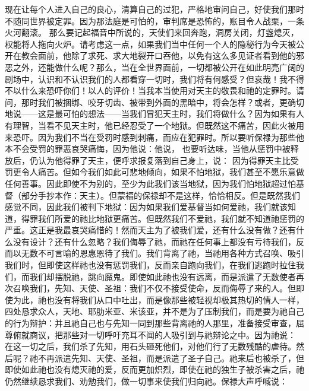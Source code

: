 现在让每个人进入自己的良心，清算自己的过犯，严格地审问自己，好使我们那时不随同世界被定罪。因为那法庭是可怕的，审判席是恐怖的，账目令人战栗，一条火河翻滚。 那么要记起福音中所说的，天使们来回奔跑，洞房关闭，灯盏熄灭，权能将人拖向火炉。请考虑这一点，如果我们当中任何一个人的隐秘行为今天被公开在教会面前，他除了求死、求大地裂开口吞他，以免有这么多见证者看到他的邪恶之外，还能做什么呢？那么，当在全世界面前，一切都被公开在如此明亮广阔的剧场中，认识和不认识我们的人都看穿一切时，我们将有何感受？但哀哉！我不得不以什么来恐吓你们！以人的评价！当我本当使用对天主的敬畏和祂的定罪时。请问，那时我们被捆绑、咬牙切齿、被带到外面的黑暗中，将会怎样？或者，更确切地说——这是最可怕的想法——当我们冒犯天主时，我们将做什么？因为如果有人有理智，当看不见天主时，他已经忍受了一个地狱。但既然这不痛苦，因此火被用来恐吓。因为我们不当在受罚时感到刺痛，而应在犯罪时。所以要听保禄为那些他本不会受罚的罪恶哀哭痛悔，因为他说：他说， 也要听达味，当他从惩罚中被释放后，仍认为他得罪了天主，便呼求报复落到自己身上，说： 因为得罪天主比受罚更令人痛苦。但如今我们如此可悲地倾向，如果不怕地狱，我们甚至不愿乐意做任何善事。因此即使不为别的，至少为此我们该当地狱，因为我们怕地狱超过怕基督（部分手抄本作：天主）。但蒙福的保禄却不是这样，恰恰相反。但是既然我们感觉不同，因此我们被判下地狱：因为如果我们爱基督当如何爱祂，我们就该知道，得罪我们所爱的祂比地狱更痛苦。但既然我们不爱祂，我们就不知道祂惩罚的严重。这正是我最哀哭痛惜的！然而天主为了被我们爱，还有什么没有做？还有什么没有设计？还有什么忽略？我们侮辱了祂，而祂在任何事上都没有亏待我们，反而以无数不可言喻的恩惠恩待了我们。我们背离了祂，当祂用各种方式召唤、吸引我们时，但即使这样祂也没有惩罚我们，反而亲自跑向我们，在我们逃跑时拉住我们，而我们却摆脱祂，跳向魔鬼。即使如此祂也没有远离，而是派遣了无数使者再次召唤我们，先知、天使、圣祖：我们不仅不接受使命，反而侮辱了来的人。但即使为此，祂也没有将我们从口中吐出，而是像那些被轻视却极其热切的情人一样，四处恳求众人，天地、耶肋米亚、米该亚，并不是为了压制我们，而是要为祂自己的行为辩护：并且祂自己也与先知一同到那些背离祂的人那里，准备接受审查，屈尊俯就商议，把那些对一切呼吁充耳不闻的人吸引到与祂辩论之中。因为祂说： 在这一切之后，我们杀了先知，用石头砸死他们，对他们行了无数残酷的虐待。然后呢？祂不再派遣先知、天使、圣祖，而是派遣了圣子自己。祂来后也被杀了，但即使如此祂也没有熄灭祂的爱，反而更加炽烈，即使在祂的独生子被杀害之后，祂仍然继续恳求我们、劝勉我们，做一切事来使我们归向祂。保禄大声呼喊说： 